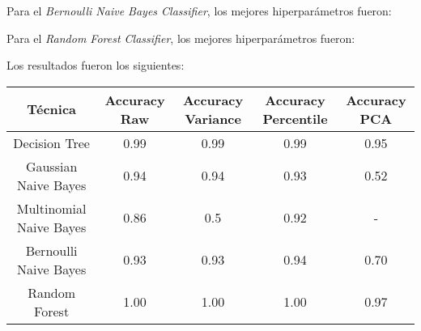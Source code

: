 Para el \emph{Bernoulli Naive Bayes Classifier}, los mejores hiperpar\'ametros fueron:
\begin{itemize}
\end{itemize}

Para el \emph{Random Forest Classifier}, los mejores hiperpar\'ametros fueron:
\begin{itemize}
\end{itemize}

Los resultados fueron los siguientes:

\begin{center}
\begin{tabular}{|c|c|c|c|c|}
  \hline
  Técnica & Accuracy Raw & Accuracy Variance & Accuracy Percentile & Accuracy PCA \\
  \hline
  Decision Tree & 0.99 & 0.99 & 0.99 & 0.95 \\
  \hline
  Gaussian Naive Bayes & 0.94 & 0.94 & 0.93 & 0.52 \\
  \hline
  Multinomial Naive Bayes & 0.86 & 0.5 & 0.92 & - \\
  \hline
  Bernoulli Naive Bayes & 0.93 & 0.93 & 0.94 & 0.70 \\
  \hline
  Random Forest & 1.00 & 1.00 & 1.00 & 0.97\\
  \hline
\end{tabular}
\end{center}
